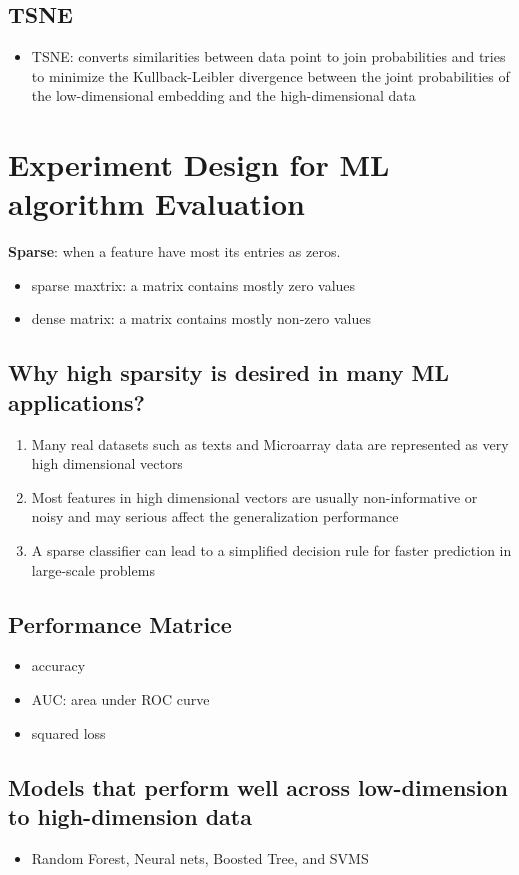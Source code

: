 \documentclass[11pt]{article}
\begin{document}
\subsection{TSNE}
\label{sec:orgb40e696}
\begin{itemize}
\item TSNE: converts similarities between data point to join probabilities and tries to minimize the Kullback-Leibler divergence between the joint probabilities of the low-dimensional embedding and the high-dimensional data
\end{itemize}

\section{Experiment Design for ML algorithm Evaluation}
\label{sec:org93fb156}
\textbf{\textbf{Sparse}}: when a feature have most its entries as zeros.
\begin{itemize}
\item sparse maxtrix: a matrix contains mostly zero values
\item dense matrix: a matrix contains mostly non-zero values
\end{itemize}
\subsection{Why high sparsity is desired in many ML applications?}
\label{sec:org705ac8f}
\begin{enumerate}
\item Many real datasets such as texts and Microarray data are represented as very high dimensional vectors
\item Most features in high dimensional vectors are usually non-informative or noisy and may serious affect the generalization performance
\item A sparse classifier can lead to a simplified decision rule for faster prediction in large-scale problems
\end{enumerate}
\subsection{Performance Matrice}
\label{sec:org8d5673d}
\begin{itemize}
\item accuracy
\item AUC: area under ROC curve
\item squared loss
\end{itemize}
\subsection{Models that perform well across low-dimension to high-dimension data}
\label{sec:orga29e458}
\begin{itemize}
\item Random Forest, Neural nets, Boosted Tree, and SVMS
\end{itemize}
\end{document}
